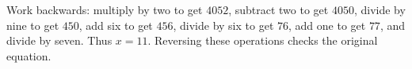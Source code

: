 Work backwards: multiply by two to get $4052$, subtract two to get $4050$, divide by nine to get $450$, add six to get $456$, divide by six to get $76$, add one to get $77$, and divide by seven. Thus $\boxed{x=11}$. Reversing these operations checks the original equation.
